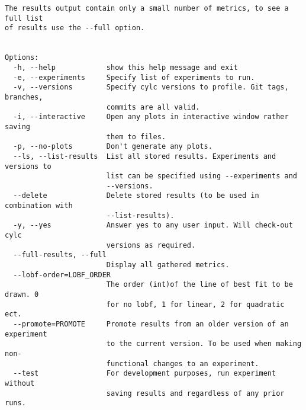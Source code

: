 \begin{lstlisting}
The results output contain only a small number of metrics, to see a full list
of results use the --full option.


Options:
  -h, --help            show this help message and exit
  -e, --experiments     Specify list of experiments to run.
  -v, --versions        Specify cylc versions to profile. Git tags, branches,
                        commits are all valid.
  -i, --interactive     Open any plots in interactive window rather saving
                        them to files.
  -p, --no-plots        Don't generate any plots.
  --ls, --list-results  List all stored results. Experiments and versions to
                        list can be specified using --experiments and
                        --versions.
  --delete              Delete stored results (to be used in combination with
                        --list-results).
  -y, --yes             Answer yes to any user input. Will check-out cylc
                        versions as required.
  --full-results, --full
                        Display all gathered metrics.
  --lobf-order=LOBF_ORDER
                        The order (int)of the line of best fit to be drawn. 0
                        for no lobf, 1 for linear, 2 for quadratic ect.
  --promote=PROMOTE     Promote results from an older version of an experiment
                        to the current version. To be used when making non-
                        functional changes to an experiment.
  --test                For development purposes, run experiment without
                        saving results and regardless of any prior runs.
\end{lstlisting}
